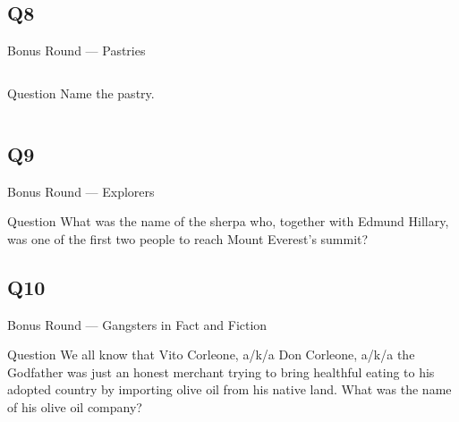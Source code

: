 \documentclass[11pt]{beamer}
\begin{document}
\subsection*{Q8}
\begin{frame}[t]{Bonus Round --- Pastries}
\begin{columns}[T,totalwidth=\linewidth]
\begin{column}{0.32\linewidth}
\begin{block}{Question}
Name the pastry.
\end{block}
\end{column}
\begin{column}{0.65\linewidth}
\begin{center}
\texttt{[image: \{Images/cronut]}.jpg}
\end{center}
\end{column}
\end{columns}
\end{frame}
\subsection*{Q9}
\begin{frame}[t]{Bonus Round --- Explorers}
\begin{block}{Question}
What was the name of the sherpa who, together with Edmund Hillary, was one of the first two people to reach Mount Everest's summit?
\end{block}
\end{frame}
\subsection*{Q10}
\begin{frame}[t]{Bonus Round --- Gangsters in Fact and Fiction}
\begin{block}{Question}
We all know that Vito Corleone, a/k/a Don Corleone, a/k/a the Godfather was just an honest merchant trying to bring healthful eating to his adopted country by importing olive oil from his native land.  What was the name of his olive oil company?
\end{block}
\end{frame}
\end{document}
